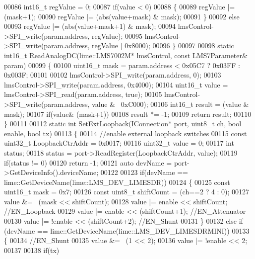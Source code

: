 \begin{DoxyCode}
00086     int16\_t regValue = 0;
00087     \textcolor{keywordflow}{if}(value < 0)
00088     \{
00089         regValue |= (mask+1);
00090         regValue |= (abs(value+mask) & mask);
00091     \}
00092     \textcolor{keywordflow}{else}
00093         regValue |= (abs(value+mask+1) & mask);
00094     lmsControl->SPI_write(param.address, regValue);
00095     lmsControl->SPI_write(param.address, regValue | 0x8000);
00096 \}
00097 
00098 \textcolor{keyword}{static} int16\_t ReadAnalogDC(lime::LMS7002M* lmsControl, \textcolor{keyword}{const} LMS7Parameter& param)
00099 \{
00100     uint16\_t mask = param.address < 0x05C7 ? 0x03FF : 0x003F;
00101 
00102     lmsControl->SPI_write(param.address, 0);
00103     lmsControl->SPI_write(param.address, 0x4000);
00104     uint16\_t value = lmsControl->SPI_read(param.address, \textcolor{keyword}{true});
00105     lmsControl->SPI_write(param.address, value & ~0xC000);
00106     int16\_t result = (value & mask);
00107     \textcolor{keywordflow}{if}(value& (mask+1))
00108         result *= -1;
00109     \textcolor{keywordflow}{return} result;
00110 \}
00111 
00112 \textcolor{keyword}{static} \textcolor{keywordtype}{int} SetExtLoopback(IConnection* port, uint8\_t ch, \textcolor{keywordtype}{bool} enable, \textcolor{keywordtype}{bool} tx)
00113 \{
00114     \textcolor{comment}{//enable external loopback switches}
00115     \textcolor{keyword}{const} uint32\_t LoopbackCtrAddr = 0x0017;
00116     uint32\_t value = 0;
00117     \textcolor{keywordtype}{int} status;
00118     status = port->ReadRegister(LoopbackCtrAddr, value);
00119     \textcolor{keywordflow}{if}(status != 0)
00120         \textcolor{keywordflow}{return} -1;
00121     \textcolor{keyword}{auto} devName = port->GetDeviceInfo().deviceName;
00122 
00123     \textcolor{keywordflow}{if}(devName == lime::GetDeviceName(lime::LMS_DEV_LIMESDR))
00124     \{
00125         \textcolor{keyword}{const} uint16\_t mask = 0x7;
00126         \textcolor{keyword}{const} uint8\_t shiftCount = (ch==2 ? 4 : 0);
00127         value &= ~(mask << shiftCount);
00128         value |= enable << shiftCount;   \textcolor{comment}{//EN\_Loopback}
00129         value |= enable << (shiftCount+1); \textcolor{comment}{//EN\_Attenuator}
00130         value |= !enable << (shiftCount+2); \textcolor{comment}{//EN\_Shunt}
00131     \}
00132     \textcolor{keywordflow}{else} \textcolor{keywordflow}{if} (devName == lime::GetDeviceName(lime::LMS_DEV_LIMESDRMINI))
00133     \{
00134         \textcolor{comment}{//EN\_Shunt}
00135         value &= ~(1 << 2);
00136         value |= !enable << 2;
00137 
00138         \textcolor{keywordflow}{if}(tx)

\end{DoxyCode}
